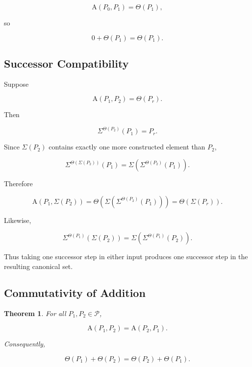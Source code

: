 \documentclass[12pt]{article}
\newtheorem{theorem}{Theorem}
\newcommand{\Alpha}{\mathrm{A}}
\begin{document}
\[
\Alpha(P_0,P_1)=\Theta(P_1),
\]

so

\[
\boxed{
0+\Theta(P_1)=\Theta(P_1).
}
\]

\subsection*{Successor Compatibility}

Suppose

\[
\Alpha(P_1,P_2)=\Theta(P_r).
\]

Then

\[
\Sigma^{\Theta(P_2)}(P_1)=P_r.
\]

Since \(\Sigma(P_2)\) contains exactly one more constructed element than \(P_2\),

\[
\Sigma^{\Theta(\Sigma(P_2))}(P_1)
=
\Sigma\left(\Sigma^{\Theta(P_2)}(P_1)\right).
\]

Therefore

\[
\Alpha(P_1,\Sigma(P_2))
=
\Theta\left(
\Sigma\left(\Sigma^{\Theta(P_2)}(P_1)\right)
\right)
=
\Theta(\Sigma(P_r)).
\]

Likewise,

\[
\Sigma^{\Theta(P_1)}(\Sigma(P_2))
=
\Sigma\left(\Sigma^{\Theta(P_1)}(P_2)\right).
\]

Thus taking one successor step in either input produces one successor step in the resulting canonical set.

\subsection*{Commutativity of Addition}

\begin{theorem}

For all \(P_1,P_2\in\mathcal P\),

\[
\Alpha(P_1,P_2)=\Alpha(P_2,P_1).
\]

Consequently,

\[
\Theta(P_1)+\Theta(P_2)=\Theta(P_2)+\Theta(P_1).
\]

\end{theorem}
\end{document}
